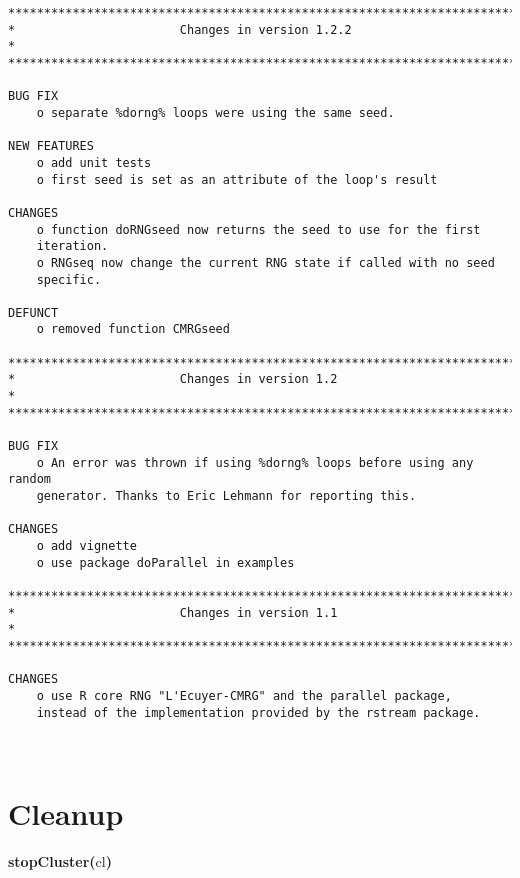 \documentclass[a4paper,12pt]{article}\usepackage{graphicx, color}
\makeatletter
\newcommand{\hlfunctioncall}[1]{\textcolor[rgb]{0.501960784313725,0,0.329411764705882}{\textbf{#1}}}%
\newcommand{\hlkeyword}[1]{\textcolor[rgb]{0,0,0}{\textbf{#1}}}%
\newcommand{\hlsymbol}[1]{\textcolor[rgb]{0,0,0}{#1}}%
\newenvironment{kframe}{%
 \def\FrameCommand##1{\hskip\@totalleftmargin \hskip-\fboxsep
 \colorbox{shadecolor}{##1}\hskip-\fboxsep
     \hskip-\linewidth \hskip-\@totalleftmargin \hskip\columnwidth}%
 \MakeFramed {\advance\hsize-\width
   \@totalleftmargin\z@ \linewidth\hsize
   \@setminipage}}%
 {\par\unskip\endMakeFramed}
\newenvironment{knitrout}{}{} %
\renewenvironment{knitrout}{\begin{footnotesize}}{\end{footnotesize}}
\makeatother
\begin{document}
{\begin{verbatim}
*************************************************************************
*                       Changes in version 1.2.2                        *
*************************************************************************

BUG FIX
    o separate %dorng% loops were using the same seed.

NEW FEATURES
    o add unit tests
    o first seed is set as an attribute of the loop's result

CHANGES
    o function doRNGseed now returns the seed to use for the first 
    iteration.
    o RNGseq now change the current RNG state if called with no seed 
    specific.  
    
DEFUNCT
    o removed function CMRGseed

*************************************************************************
*                       Changes in version 1.2                          *
*************************************************************************

BUG FIX
    o An error was thrown if using %dorng% loops before using any random
    generator. Thanks to Eric Lehmann for reporting this.

CHANGES
    o add vignette
    o use package doParallel in examples

*************************************************************************
*                       Changes in version 1.1                          *
*************************************************************************

CHANGES
    o use R core RNG "L'Ecuyer-CMRG" and the parallel package, 
    instead of the implementation provided by the rstream package.



\end{verbatim}
}


\section*{Cleanup}
\begin{knitrout}
\color{fgcolor}\begin{kframe}
\begin{flushleft}
\ttfamily\noindent
\hlfunctioncall{stopCluster}\hlkeyword{(}\hlsymbol{cl}\hlkeyword{)}\mbox{}
\normalfont
\end{flushleft}
\end{kframe}
\end{knitrout}
\end{document}
